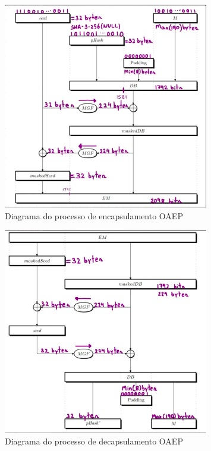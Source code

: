\documentclass{article}
\begin{document}
\begin{figure}[h]
    \centering
    \includegraphics[width=0.8\textwidth]{enc_oaep.png}
    \caption{Diagrama do processo de encapsulamento OAEP}
    \label{fig:enc_oaep}
\end{figure}

\begin{figure}[h]
    \centering
    \includegraphics[width=0.8\textwidth]{dec_oaep.png}
    \caption{Diagrama do processo de decapsulamento OAEP}
    \label{fig:dec_oaep}
\end{figure}
\end{document}
